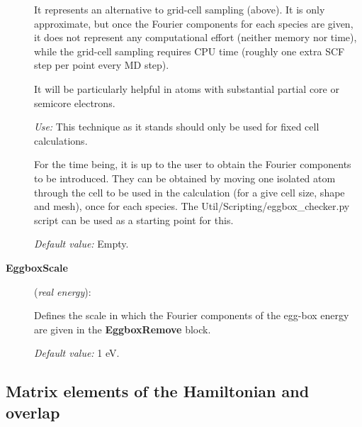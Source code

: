 \documentclass[11pt]{article}
\begin{document}
\begin{description}
It represents an alternative to grid-cell sampling (above).
It is only approximate, but once the Fourier components for each
species are given, it does not represent any computational
effort (neither memory nor time), while the grid-cell sampling
requires CPU time (roughly one extra SCF step per point every
MD step).

It will be particularly helpful in atoms with substantial partial
core or semicore electrons.

{\it Use:} This technique as it stands should only be used for fixed cell
calculations.

For the time being, it is up to the user to obtain the Fourier
components to be introduced. They can be obtained by moving one
isolated atom through the cell to be used in the calculation
(for a give cell size, shape and mesh), once for each species.
The Util/Scripting/eggbox\_checker.py script can be used as a starting
point for this.

{\it Default value:} Empty.


\item[{\bf EggboxScale}] ({\it real energy}):

Defines the scale in which the Fourier components of the
egg-box energy are given in the {\bf EggboxRemove} block.

{\it Default value:} 1 eV.

\end{description}

\subsection{Matrix elements of the Hamiltonian and overlap}
\end{document}
